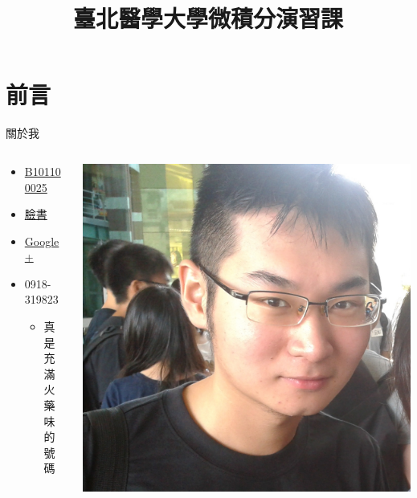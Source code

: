 \documentclass{Slideshow}
\begin{document}
\title[微積分演習課]{臺北醫學大學微積分演習課}
\maketitle

\section{前言}
\begin{frame}{關於我}
    \begin{columns}[onlytextwidth]
        \begin{column}{0.6\textwidth}
            \begin{itemize}
                \item \href{http://my2.tmu.edu.tw/b101100025}{B101100025}
                \item \href{https://www.facebook.com/jdh863}{臉書}
                \item \href{https://plus.google.com/+\%E4\%BD\%95\%E9\%9C\%87\%E9\%82\%A6-jdh8}{Google+}
                \item 0918-319823
                    \begin{itemize}
                        \item 真是充滿火藥味的號碼
                    \end{itemize}
            \end{itemize}
        \end{column}

        \begin{column}{0.4\textwidth}
            \begin{flushleft}
                \newlength{\stickerwidth}
                \setlength{\stickerwidth}{\columnwidth - 1em}
                \includegraphics[width=\stickerwidth]{Introduction/sticker.jpg}
            \end{flushleft}
        \end{column}
    \end{columns}
\end{frame}
\end{document}
